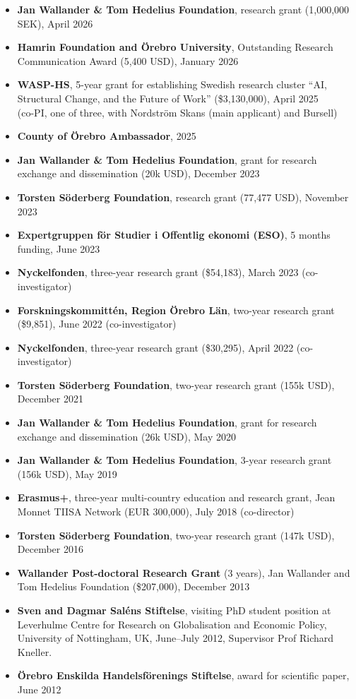 \documentclass[11pt,a4paper]{article}
\newcommand{\cventry}[1]{\item #1}
\begin{document}
\begin{itemize}
  \cventry{\textbf{Jan Wallander \& Tom Hedelius Foundation}, research grant (1,000,000 SEK), April 2026}

  \cventry{\textbf{Hamrin Foundation and Örebro University}, Outstanding Research Communication Award (5,400 USD), January 2026}

  \cventry{\textbf{WASP-HS}, 5-year grant for establishing Swedish research cluster ``AI, Structural Change, and the Future of Work'' (\$3,130,000), April 2025\\
  (co-PI, one of three, with Nordström Skans (main applicant) and Bursell)}

  \cventry{\textbf{County of Örebro Ambassador}, 2025}

  \cventry{\textbf{Jan Wallander \& Tom Hedelius Foundation}, grant for research exchange and dissemination (20k USD), December 2023}

  \cventry{\textbf{Torsten Söderberg Foundation}, research grant (77,477 USD), November 2023}

  \cventry{\textbf{Expertgruppen för Studier i Offentlig ekonomi (ESO)}, 5 months funding, June 2023}

  \cventry{\textbf{Nyckelfonden}, three-year research grant (\$54,183), March 2023 (co-investigator)}

  \cventry{\textbf{Forskningskommittén, Region Örebro Län}, two-year research grant (\$9,851), June 2022 (co-investigator)}

  \cventry{\textbf{Nyckelfonden}, three-year research grant (\$30,295), April 2022 (co-investigator)}

  \cventry{\textbf{Torsten Söderberg Foundation}, two-year research grant (155k USD), December 2021}

  \cventry{\textbf{Jan Wallander \& Tom Hedelius Foundation}, grant for research exchange and dissemination (26k USD), May 2020}

  \cventry{\textbf{Jan Wallander \& Tom Hedelius Foundation}, 3-year research grant (156k USD), May 2019}

  \cventry{\textbf{Erasmus+}, three-year multi-country education and research grant, Jean Monnet TIISA Network (EUR 300,000), July 2018 (co-director)} %

  \cventry{\textbf{Torsten Söderberg Foundation}, two-year research grant (147k USD), December 2016}

  \cventry{\textbf{Wallander Post-doctoral Research Grant} (3 years), Jan Wallander and Tom Hedelius Foundation (\$207,000), December 2013}

  \cventry{\textbf{Sven and Dagmar Saléns Stiftelse}, visiting PhD student position at Leverhulme Centre for Research on Globalisation and Economic Policy, University of Nottingham, UK, June--July 2012}, Supervisor Prof Richard Kneller.

  \cventry{\textbf{Örebro Enskilda Handelsförenings Stiftelse}, award for scientific paper, June 2012}
\end{itemize}
\end{document}
